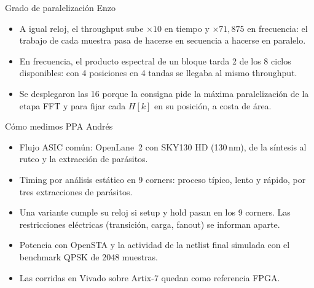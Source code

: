 \documentclass[aspectratio=169,11pt]{beamer}
\newcommand{\presenta}[1]{\hfill{\normalfont\small\color{gray}#1}}
\begin{document}
\begin{frame}{Grado de paralelización \presenta{Enzo}}
  \begin{itemize}
    \item A igual reloj, el throughput sube $\times 10$ en tiempo y $\times 71{,}875$ en frecuencia: el trabajo de cada muestra pasa de hacerse en secuencia a hacerse en paralelo.
    \item En frecuencia, el producto espectral de un bloque tarda 2 de los 8 ciclos disponibles: con 4 posiciones en 4 tandas se llegaba al mismo throughput.
    \item Se desplegaron las 16 porque la consigna pide la máxima paralelización de la etapa FFT y para fijar cada $H[k]$ en su posición, a costa de área.
  \end{itemize}
\end{frame}

\begin{frame}{Cómo medimos PPA \presenta{Andrés}}
  \begin{itemize}
    \item Flujo ASIC común: OpenLane~2 con SKY130 HD (130\,nm), de la síntesis al ruteo y la extracción de parásitos.
    \item Timing por análisis estático en 9 corners: proceso típico, lento y rápido, por tres extracciones de parásitos.
    \item Una variante cumple su reloj si setup y hold pasan en los 9 corners. Las restricciones eléctricas (transición, carga, fanout) se informan aparte.
    \item Potencia con OpenSTA y la actividad de la netlist final simulada con el benchmark QPSK de 2048 muestras.
    \item Las corridas en Vivado sobre Artix-7 quedan como referencia FPGA.
  \end{itemize}
\end{frame}
\end{document}
